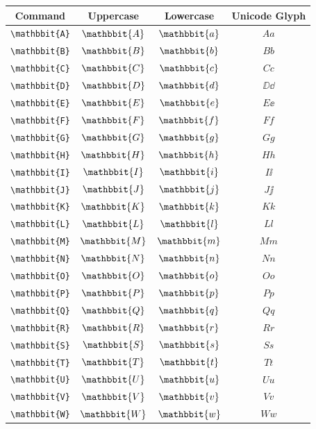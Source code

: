 \documentclass[12pt,a4paper]{article}
\begin{document}
\begin{longtable}{|c|c|c|c|}
\hline
\textbf{Command} & \textbf{Uppercase} & \textbf{Lowercase} & \textbf{Unicode Glyph} \\
\hline
\verb|\mathbbit{A}| & $\mathbbit{A}$ & $\mathbbit{a}$ & $ 𝐴 𝑎 $ \\
\verb|\mathbbit{B}| & $\mathbbit{B}$ & $\mathbbit{b}$ & $ 𝐵 𝑏 $ \\
\verb|\mathbbit{C}| & $\mathbbit{C}$ & $\mathbbit{c}$ & $ 𝐶 𝑐 $ \\
\verb|\mathbbit{D}| & $\mathbbit{D}$ & $\mathbbit{d}$ & $ ⅅ ⅆ $ \\
\verb|\mathbbit{E}| & $\mathbbit{E}$ & $\mathbbit{e}$ & $ 𝐸 ⅇ $ \\
\verb|\mathbbit{F}| & $\mathbbit{F}$ & $\mathbbit{f}$ & $ 𝐹 𝑓 $ \\
\verb|\mathbbit{G}| & $\mathbbit{G}$ & $\mathbbit{g}$ & $ 𝐺 𝑔 $ \\
\verb|\mathbbit{H}| & $\mathbbit{H}$ & $\mathbbit{h}$ & $ 𝐻 ℎ $ \\
\verb|\mathbbit{I}| & $\mathbbit{I}$ & $\mathbbit{i}$ & $ 𝐼 ⅈ $ \\
\verb|\mathbbit{J}| & $\mathbbit{J}$ & $\mathbbit{j}$ & $ 𝐽 ⅉ $ \\
\verb|\mathbbit{K}| & $\mathbbit{K}$ & $\mathbbit{k}$ & $ 𝐾 𝑘 $ \\
\verb|\mathbbit{L}| & $\mathbbit{L}$ & $\mathbbit{l}$ & $ 𝐿 𝑙 $ \\
\verb|\mathbbit{M}| & $\mathbbit{M}$ & $\mathbbit{m}$ & $ 𝑀 𝑚 $ \\
\verb|\mathbbit{N}| & $\mathbbit{N}$ & $\mathbbit{n}$ & $ 𝑁 𝑛 $ \\
\verb|\mathbbit{O}| & $\mathbbit{O}$ & $\mathbbit{o}$ & $ 𝑂 𝑜 $ \\
\verb|\mathbbit{P}| & $\mathbbit{P}$ & $\mathbbit{p}$ & $ 𝑃 𝑝 $ \\
\verb|\mathbbit{Q}| & $\mathbbit{Q}$ & $\mathbbit{q}$ & $ 𝑄 𝑞 $ \\
\verb|\mathbbit{R}| & $\mathbbit{R}$ & $\mathbbit{r}$ & $ 𝑅 𝑟 $ \\
\verb|\mathbbit{S}| & $\mathbbit{S}$ & $\mathbbit{s}$ & $ 𝑆 𝑠 $ \\
\verb|\mathbbit{T}| & $\mathbbit{T}$ & $\mathbbit{t}$ & $ 𝑇 𝑡 $ \\
\verb|\mathbbit{U}| & $\mathbbit{U}$ & $\mathbbit{u}$ & $ 𝑈 𝑢 $ \\
\verb|\mathbbit{V}| & $\mathbbit{V}$ & $\mathbbit{v}$ & $ 𝑉 𝑣 $ \\
\verb|\mathbbit{W}| & $\mathbbit{W}$ & $\mathbbit{w}$ & $ 𝑊 𝑤 $ \\

\end{longtable}
\end{document}
